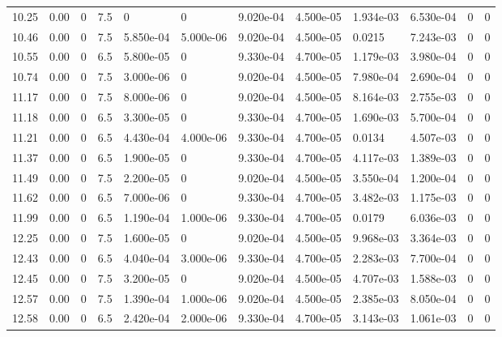 \documentclass[preview]{standalone}
\begin{document}
{{{\begin{tabular}{L{1.2cm}C{1.2cm} C{0.3cm}C{0.5cm} C{1.4cm}C{1.4cm} C{1.4cm}C{1.4cm} C{1.6cm}C{1.6cm} C{1.6cm}C{1.6cm}}
  10.25  &  0.00  & 0     & 7.5 &  0  & 0  &  9.020e-04&   4.500e-05& 1.934e-03 & 6.530e-04   &  0 & 0  \\ 
  10.46  &  0.00  & 0     & 7.5 &  5.850e-04  & 5.000e-06  &  9.020e-04&   4.500e-05& 0.0215 & 7.243e-03   &  0 & 0  \\ 
  10.55  &  0.00  & 0     & 6.5 &  5.800e-05  & 0  &  9.330e-04&   4.700e-05& 1.179e-03 & 3.980e-04   &  0 & 0  \\ 
  10.74  &  0.00  & 0     & 7.5 &  3.000e-06  & 0  &  9.020e-04&   4.500e-05& 7.980e-04 & 2.690e-04   &  0 & 0  \\ 
  11.17  &  0.00  & 0     & 7.5 &  8.000e-06  & 0  &  9.020e-04&   4.500e-05& 8.164e-03 & 2.755e-03   &  0 & 0  \\ 
  11.18  &  0.00  & 0     & 6.5 &  3.300e-05  & 0  &  9.330e-04&   4.700e-05& 1.690e-03 & 5.700e-04   &  0 & 0  \\ 
  11.21  &  0.00  & 0     & 6.5 &  4.430e-04  & 4.000e-06  &  9.330e-04&   4.700e-05& 0.0134 & 4.507e-03   &  0 & 0  \\ 
  11.37  &  0.00  & 0     & 6.5 &  1.900e-05  & 0  &  9.330e-04&   4.700e-05& 4.117e-03 & 1.389e-03   &  0 & 0  \\ 
  11.49  &  0.00  & 0     & 7.5 &  2.200e-05  & 0  &  9.020e-04&   4.500e-05& 3.550e-04 & 1.200e-04   &  0 & 0  \\ 
  11.62  &  0.00  & 0     & 6.5 &  7.000e-06  & 0  &  9.330e-04&   4.700e-05& 3.482e-03 & 1.175e-03   &  0 & 0  \\ 
  11.99  &  0.00  & 0     & 6.5 &  1.190e-04  & 1.000e-06  &  9.330e-04&   4.700e-05& 0.0179 & 6.036e-03   &  0 & 0  \\ 
  12.25  &  0.00  & 0     & 7.5 &  1.600e-05  & 0  &  9.020e-04&   4.500e-05& 9.968e-03 & 3.364e-03   &  0 & 0  \\ 
  12.43  &  0.00  & 0     & 6.5 &  4.040e-04  & 3.000e-06  &  9.330e-04&   4.700e-05& 2.283e-03 & 7.700e-04   &  0 & 0  \\ 
  12.45  &  0.00  & 0     & 7.5 &  3.200e-05  & 0  &  9.020e-04&   4.500e-05& 4.707e-03 & 1.588e-03   &  0 & 0  \\ 
  12.57  &  0.00  & 0     & 7.5 &  1.390e-04  & 1.000e-06  &  9.020e-04&   4.500e-05& 2.385e-03 & 8.050e-04   &  0 & 0  \\ 
  12.58  &  0.00  & 0     & 6.5 &  2.420e-04  & 2.000e-06  &  9.330e-04&   4.700e-05& 3.143e-03 & 1.061e-03   &  0 & 0  \\ 
\hline 
\end{tabular} 

}}}
\end{document}
